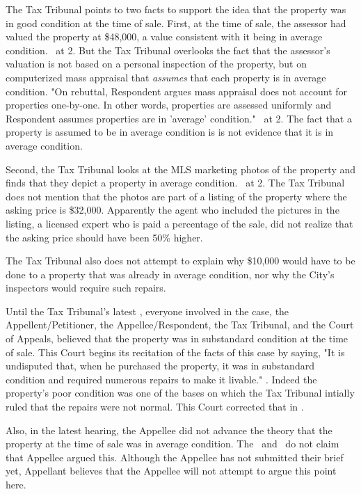 \documentclass[12pt,\documentclassflag]{michiganCourtOfAppealsBrief}
\begin{document}
The Tax Tribunal points to two facts to support the idea that the property was in good condition at the time of sale. First, at the time of sale, the assessor had valued the property at \$48,000, a value consistent with it being in average condition. \orderDenying\ at 2. But the Tax Tribunal overlooks the fact that the assessor's valuation is not based on a personal inspection of the property, but on computerized mass appraisal that \textit{assumes} that each property is in average condition. "On rebuttal, Respondent argues mass appraisal does not account for properties one-by-one. In other words, properties are assessed uniformly and Respondent assumes properties are in 'average' condition." \FOJ\ at 2. The fact that a property is assumed to be in average condition is is not evidence that it is in average condition.

Second, the Tax Tribunal looks at the MLS marketing photos of the property and finds that they depict a property in average condition. \orderDenying\ at 2. The Tax Tribunal does not mention that the photos are part of a listing of the property where the asking price is \$32,000. Apparently the agent who included the pictures in the listing, a licensed expert who is paid a percentage of the sale, did not realize that the asking price should have been 50\% higher.

The Tax Tribunal also does not attempt to explain why \$10,000 would have to be done to a property that was already in average condition, nor why the City's inspectors would require such repairs.

Until the Tax Tribunal's latest \FOJ, everyone involved in the case, the Appellent/Petitioner, the Appellee/Respondent, the Tax Tribunal, and the Court of Appeals, believed that the property was in substandard condition at the time of sale. This Court begins its recitation of the facts of this case by saying, "It is undisputed that, when he purchased the property, it was in substandard condition and required numerous repairs to make it livable." . Indeed the property's poor condition was one of the bases on which the Tax Tribunal intially ruled that the repairs were not normal. This Court corrected that in \cite{patru v wayne}.

Also, in the latest hearing, the Appellee did not advance the theory that the property at the time of sale was in average condition. The \FOJ\ and \orderDenying\ do not claim that Appellee argued this. Although the Appellee has not submitted their brief yet, Appellant believes that the Appellee will not attempt to argue this point here. 
\end{document}
